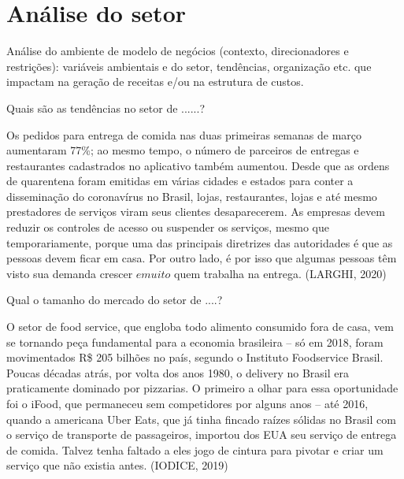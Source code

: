 \section{\textbf{Análise do setor}}
\label{sec: Análise do setor}

\begin{commentA} \vspace{0.3cm} \noindent Análise do ambiente de modelo de negócios (contexto, direcionadores e restrições): variáveis ambientais e do setor, tendências, organização etc. que impactam na geração de receitas e/ou na estrutura de custos. \par \vspace{0.1cm} \end{commentA}

\begin{commentA} \vspace{0.3cm} \noindent Quais são as tendências no setor de ......? \par \vspace{0.1cm} \end{commentA}

Os pedidos para entrega de comida nas duas primeiras semanas de março aumentaram 77\%; ao mesmo tempo, o número de parceiros de entregas e restaurantes cadastrados no aplicativo também aumentou. Desde que as ordens de quarentena foram emitidas em várias cidades e estados para conter a disseminação do coronavírus no Brasil, lojas, restaurantes, lojas e até mesmo prestadores de serviços viram seus clientes desaparecerem. As empresas devem reduzir os controles de acesso ou suspender os serviços, mesmo que temporariamente, porque uma das principais diretrizes das autoridades é que as pessoas devem ficar em casa. Por outro lado, é por isso que algumas pessoas têm visto sua demanda crescer \(e muito\)\: quem trabalha na entrega. (LARGHI, 2020)\par

\begin{commentA} \vspace{0.3cm} \noindent Qual o tamanho do mercado do setor de ....? \par \vspace{0.1cm} \end{commentA}

O setor de food service, que engloba todo alimento consumido fora de casa, vem se tornando peça fundamental para a economia brasileira – só em 2018, foram movimentados R\$ 205 bilhões no país, segundo o Instituto Foodservice Brasil. Poucas décadas atrás, por volta dos anos 1980, o delivery no Brasil era praticamente dominado por pizzarias. O primeiro a olhar para essa oportunidade foi o iFood, que permaneceu sem competidores por alguns anos – até 2016, quando a americana Uber Eats, que já tinha fincado raízes sólidas no Brasil com o serviço de transporte de passageiros, importou dos EUA seu serviço de entrega de comida. Talvez tenha faltado a eles jogo de cintura para pivotar e criar um serviço que não existia antes. (IODICE, 2019)\par

